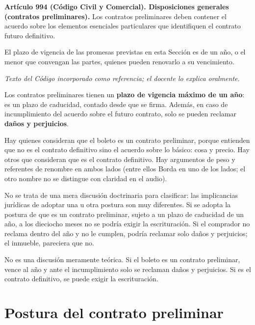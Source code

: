 \documentclass[12pt,oneside]{book}
\begin{document}

\begin{note}
\textbf{Artículo 994 (Código Civil y Comercial). Disposiciones generales (contratos preliminares).} Los contratos preliminares deben contener el acuerdo sobre los elementos esenciales particulares que identifiquen el contrato futuro definitivo.

El plazo de vigencia de las promesas previstas en esta Sección es de un año, o el menor que convengan las partes, quienes pueden renovarlo a su vencimiento.

\emph{Texto del Código incorporado como referencia; el docente lo explica oralmente.}
\end{note}

Los contratos preliminares tienen un \textbf{plazo de vigencia máximo de un año}: es un plazo de caducidad, contado desde que se firma. Además, en caso de incumplimiento del acuerdo sobre el futuro contrato, solo se pueden reclamar \textbf{daños y perjuicios}.

Hay quienes consideran que el boleto es un contrato preliminar, porque entienden que no es el contrato definitivo sino el acuerdo sobre lo básico: cosa y precio. Hay otros que consideran que es el contrato definitivo. Hay argumentos de peso y referentes de renombre en ambos lados (entre ellos Borda en uno de los lados; el otro nombre no se distingue con claridad en el audio).

No se trata de una mera discusión doctrinaria para clasificar: las implicancias jurídicas de adoptar una u otra postura son muy diferentes. Si se adopta la postura de que es un contrato preliminar, sujeto a un plazo de caducidad de un año, a los dieciocho meses no se podría exigir la escrituración. Si el comprador no reclama dentro del año y no le cumplen, podría reclamar solo daños y perjuicios; el inmueble, pareciera que no.

\begin{important}
No es una discusión meramente teórica. Si el boleto es un contrato preliminar, vence al año y ante el incumplimiento solo se reclaman daños y perjuicios. Si es el contrato definitivo, se puede exigir la escrituración.
\end{important}

\section{Postura del contrato preliminar}
\end{document}
